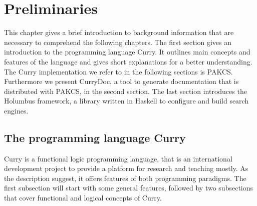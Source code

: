 \documentclass[%
	pdftex,%
	a4paper,%
	oneside,%
	chapterprefix,%
	headsepline,%
	12pt%
]{scrbook}
\begin{document}
\chapter{Preliminaries}\label{preliminaries}
This chapter gives a brief introduction to background information
that are necessary to comprehend the following chapters. The first
section gives an introduction to the programming language Curry. It
outlines main concepts and features of the language and gives short
explanations for a better understanding. The Curry implementation we
refer to in the following sections is PAKCS\cite{pakcs}. Furthermore
we present CurryDoc\cite{currydoc}, a tool to generate documentation
that is distributed with PAKCS, in the second section. The last
section introduces the Holumbus\cite{holumbus} framework, a library
written in Haskell to configure and build search engines.

\section{The programming language Curry}\label{preliminaries:curry}


Curry is a functional logic programming language, that is an
international development project to provide a platform for research
and teaching mostly. As the description suggest, it offers features of
both programming paradigms. The first subsection will start with some general
features, followed by two subsections that cover
functional and logical concepts of Curry. \\

\end{document}
